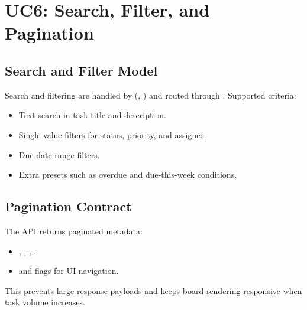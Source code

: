 \section{UC6: Search, Filter, and Pagination}



\subsection{Search and Filter Model}

Search and filtering are handled by  (, ) and routed through .
Supported criteria:
\begin{itemize}
    \item Text search in task title and description.
    \item Single-value filters for status, priority, and assignee.
    \item Due date range filters.
    \item Extra presets such as overdue and due-this-week conditions.
\end{itemize}

\subsection{Pagination Contract}

The API returns paginated metadata:
\begin{itemize}
    \item {}, , , .
    \item {} and  flags for UI navigation.
\end{itemize}

This prevents large response payloads and keeps board rendering responsive when task volume increases.

